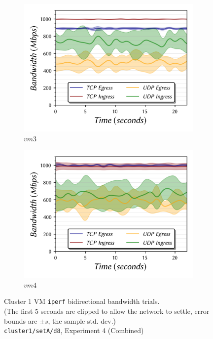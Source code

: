 \documentclass[a4paper,10pt]{article}
\begin{document}
\begin{figure}
\hfill%
\begin{subfigure}{.33\textwidth}
  \centering
  \includegraphics[width=\hsize]{figs/cluster1/setA/vis-5-vm3-combined.png}
  \caption{$vm3$}
  \label{fig:bw-bidir-1:d}
\end{subfigure}%
\begin{subfigure}{.33\textwidth}
  \centering
  \includegraphics[width=\hsize]{figs/cluster1/setA/vis-5-vm4-combined.png}
  \caption{$vm4$}
  \label{fig:bw-bidir-1:e}
\end{subfigure}%
\hspace{0.17\textwidth}


\caption{\centering{} Cluster 1 VM \texttt{iperf} bidirectional bandwidth trials. \\ (The first 5 seconds are clipped to allow the network to settle, error bounds are $\pm s$, the sample std. dev.) \\ \texttt{cluster1/setA/d8}, Experiment 4 (Combined) }
\label{fig:bw-bidir-1}
\end{figure}
\end{document}
